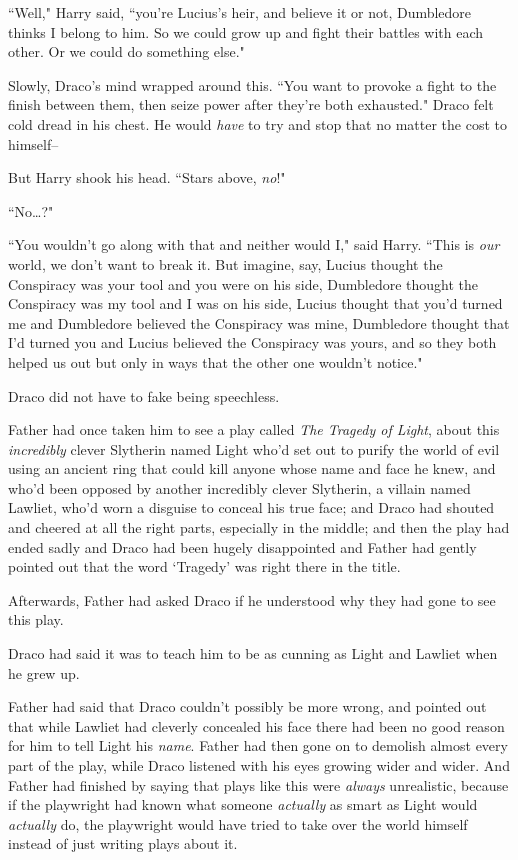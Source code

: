 ``Well," Harry said, ``you're Lucius's heir, and believe it or not, Dumbledore thinks I belong to him. So we could grow up and fight their battles with each other. Or we could do something else."

Slowly, Draco's mind wrapped around this. ``You want to provoke a fight to the finish between them, then seize power after they're both exhausted." Draco felt cold dread in his chest. He would \emph{have} to try and stop that no matter the cost to himself\---

But Harry shook his head. ``Stars above, \emph{no}!"

``No{\ldots}?"

``You wouldn't go along with that and neither would I," said Harry. ``This is \emph{our} world, we don't want to break it. But imagine, say, Lucius thought the Conspiracy was your tool and you were on his side, Dumbledore thought the Conspiracy was my tool and I was on his side, Lucius thought that you'd turned me and Dumbledore believed the Conspiracy was mine, Dumbledore thought that I'd turned you and Lucius believed the Conspiracy was yours, and so they both helped us out but only in ways that the other one wouldn't notice."

Draco did not have to fake being speechless.

Father had once taken him to see a play called \emph{The Tragedy of Light}, about this \emph{incredibly} clever Slytherin named Light who'd set out to purify the world of evil using an ancient ring that could kill anyone whose name and face he knew, and who'd been opposed by another incredibly clever Slytherin, a villain named Lawliet, who'd worn a disguise to conceal his true face; and Draco had shouted and cheered at all the right parts, especially in the middle; and then the play had ended sadly and Draco had been hugely disappointed and Father had gently pointed out that the word `Tragedy' was right there in the title.

Afterwards, Father had asked Draco if he understood why they had gone to see this play.

Draco had said it was to teach him to be as cunning as Light and Lawliet when he grew up.

Father had said that Draco couldn't possibly be more wrong, and pointed out that while Lawliet had cleverly concealed his face there had been no good reason for him to tell Light his \emph{name}. Father had then gone on to demolish almost every part of the play, while Draco listened with his eyes growing wider and wider. And Father had finished by saying that plays like this were \emph{always} unrealistic, because if the playwright had known what someone \emph{actually} as smart as Light would \emph{actually} do, the playwright would have tried to take over the world himself instead of just writing plays about it.

